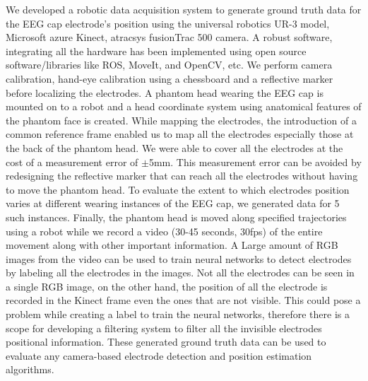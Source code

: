 We developed a robotic data acquisition system to generate ground truth data for the EEG cap electrode's position using the universal robotics UR-3 model, Microsoft azure Kinect, atracsys fusionTrac 500 camera. A robust software, integrating all the hardware has been implemented using open source software/libraries like ROS, MoveIt, and OpenCV, etc. We perform camera calibration, hand-eye calibration using a chessboard and a reflective marker before localizing the electrodes. A phantom head wearing the EEG cap is mounted on to a robot and a head coordinate system using anatomical features of the phantom face is created. While mapping the electrodes, the introduction of a common reference frame enabled us to map all the electrodes especially those at the back of the phantom head. We were able to cover all the electrodes at the cost of a measurement error of $\pm$5mm. This measurement error can be avoided by redesigning the reflective marker that can reach all the electrodes without having to move the phantom head. To evaluate the extent to which electrodes position varies at different wearing instances of the EEG cap, we generated data for 5 such instances. Finally, the phantom head is moved along specified trajectories using a robot while we record a video (30-45 seconds, 30fps) of the entire movement along with other important information. A Large amount of RGB images from the video can be used to train neural networks to detect electrodes by labeling all the electrodes in the images. Not all the electrodes can be seen in a single RGB image, on the other hand, the position of all the electrode is recorded in the Kinect frame even the ones that are not visible. This could pose a problem while creating a label to train the neural networks, therefore there is a scope for developing a filtering system to filter all the invisible electrodes positional information. These generated ground truth data can be used to evaluate any camera-based electrode detection and position estimation algorithms.